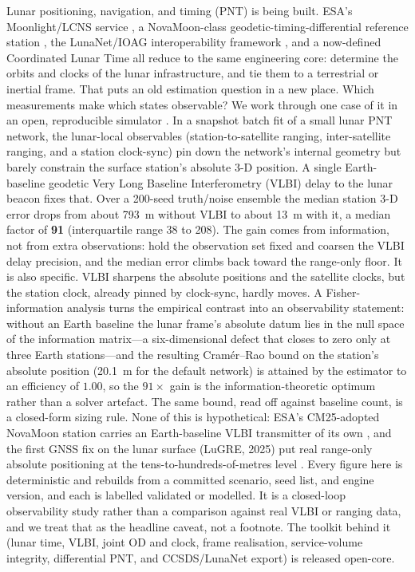 Lunar positioning, navigation, and timing (PNT) is being built. ESA's
Moonlight/LCNS service \citep{esa_moonlight,telespazio2024moonlight}, a
NovaMoon-class geodetic-timing-differential reference station
\citep{molli2026novamoon}, the LunaNet/IOAG interoperability framework
\citep{nasa2025lnis}, and a now-defined Coordinated Lunar Time
\citep{iau2024lcrs,ashby2024lunartime} all reduce to the same engineering core:
determine the orbits and clocks of the lunar infrastructure, and tie them to a
terrestrial or inertial frame. That puts an old estimation question in a new
place. Which measurements make which states observable? We work through one case
of it in an open, reproducible simulator
\citep{iiyama2023lupnt,baweja2026kshana}. In a snapshot batch fit of a small
lunar PNT network, the lunar-local observables (station-to-satellite ranging,
inter-satellite ranging, and a station clock-sync) pin down the network's
internal geometry but barely constrain the surface station's absolute 3-D
position. A single Earth-baseline geodetic Very Long Baseline Interferometry
(VLBI) delay to the lunar beacon fixes that. Over a 200-seed truth/noise
ensemble the median station 3-D error drops from about 793~m without VLBI to
about 13~m with it, a median factor of \textbf{91} (interquartile range 38 to
208). The gain comes from information, not from extra observations: hold the
observation set fixed and coarsen the VLBI delay precision, and the median error
climbs back toward the range-only floor. It is also specific. VLBI sharpens the
absolute positions and the satellite clocks, but the station clock, already
pinned by clock-sync, hardly moves. A Fisher-information analysis turns the
empirical contrast into an observability statement: without an Earth baseline the
lunar frame's absolute datum lies in the null space of the information matrix---a
six-dimensional defect that closes to zero only at three Earth stations---and the
resulting Cram\'er--Rao bound on the station's absolute position
(\SI{20.1}{\meter} for the default network) is attained by the estimator to an
efficiency of $1.00$, so the $91\times$ gain is the information-theoretic optimum
rather than a solver artefact. The same bound, read off against baseline count,
is a closed-form sizing rule. None of this is hypothetical: ESA's CM25-adopted NovaMoon
station carries an Earth-baseline VLBI transmitter of its own
\citep{molli2026novamoon}, and the first GNSS fix on the lunar surface (LuGRE,
2025) put real range-only absolute positioning at the tens-to-hundreds-of-metres
level \citep{lugre2026}. Every figure here is deterministic and rebuilds from a
committed scenario, seed list, and engine version, and each is labelled validated
or modelled. It is a closed-loop observability study rather than a comparison
against real VLBI or ranging data, and we treat that as the headline caveat, not
a footnote. The toolkit behind it (lunar time, VLBI, joint OD and clock, frame
realisation, service-volume integrity, differential PNT, and CCSDS/LunaNet
export) is released open-core.
